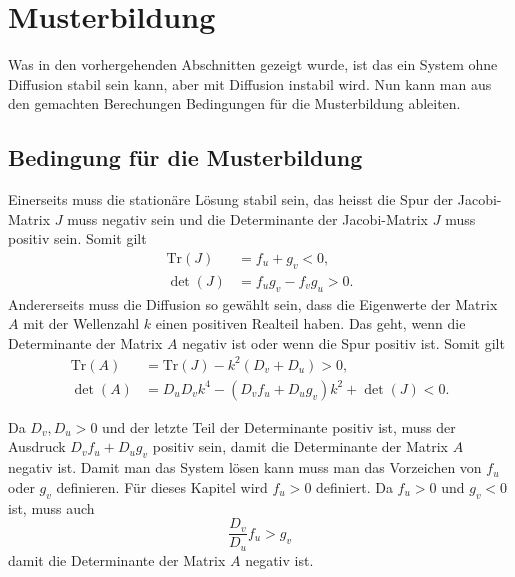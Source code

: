 \section{Musterbildung
\label{reaktdiff:section:diffusioninduzierteInstabilitaet}}
Was in den vorhergehenden Abschnitten gezeigt wurde, ist das ein System ohne Diffusion stabil sein kann, aber mit Diffusion instabil wird.
Nun kann man aus den gemachten Berechungen Bedingungen für die Musterbildung ableiten.

\subsection{Bedingung für die Musterbildung}
Einerseits muss die stationäre Lösung stabil sein, das heisst die Spur der Jacobi-Matrix \(J\) muss negativ sein und die Determinante der Jacobi-Matrix \(J\) muss positiv sein.
Somit gilt
\begin{align*}
    \text{Tr}(J) &= f_u + g_v < 0,
    \\
    \det(J) &= f_u g_v - f_v g_u > 0.
\end{align*}
Andererseits muss die Diffusion so gewählt sein, dass die Eigenwerte der Matrix \(A\) mit der Wellenzahl \(k\) einen positiven Realteil haben.
Das geht, wenn die Determinante der Matrix \(A\) negativ ist oder wenn die Spur positiv ist.
Somit gilt
\begin{align}
    \text{Tr}(A) &= \text{Tr}(J) - k^2(D_v + D_u)  > 0, \\
    \det(A) &= D_u D_v k^4 - (D_v f_u + D_u g_v)k^2 + \det(J) < 0.
    \label{reaktdiff:equation:reaktdiffbedingunen}
\end{align}

Da \(D_v,D_u > 0\) und der letzte Teil der Determinante positiv ist, muss der Ausdruck \(D_v f_u + D_u g_v\) positiv sein, damit die Determinante der Matrix \(A\) negativ ist.
Damit man das System lösen kann muss man das Vorzeichen von \(f_u\) oder \(g_v\) definieren.
Für dieses Kapitel wird \(f_u > 0\) definiert.
Da \(f_u > 0\) und \(g_v < 0\) ist, muss auch
\begin{equation*}
    \frac{D_v}{D_u}f_u > g_v
\end{equation*}
damit die Determinante der Matrix \(A\) negativ ist.

